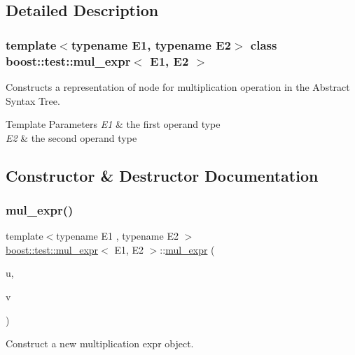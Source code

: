 \subsection{Detailed Description}
\subsubsection*{template$<$typename E1, typename E2$>$\newline
class boost\+::test\+::mul\+\_\+expr$<$ E1, E2 $>$}

Constructs a representation of node for multiplication operation in the Abstract Syntax Tree. 


\begin{DoxyTemplParams}{Template Parameters}
{\em E1} & the first operand type \\
\hline
{\em E2} & the second operand type \\
\hline
\end{DoxyTemplParams}


\subsection{Constructor \& Destructor Documentation}
\mbox{\label{classboost_1_1test_1_1mul__expr_a7ee6cd43e53cc3a611d11021d2ce7b4a}} 
\subsubsection{\texorpdfstring{mul\_expr()}{mul\_expr()}}
{\footnotesize\ttfamily template$<$typename E1 , typename E2 $>$ \\
\mbox{\hyperlink{classboost_1_1test_1_1mul__expr}{boost\+::test\+::mul\+\_\+expr}}$<$ E1, E2 $>$\+::\mbox{\hyperlink{classboost_1_1test_1_1mul__expr}{mul\+\_\+expr}} (\begin{DoxyParamCaption}\item[{E1 const \&}]{u,  }\item[{E2 const \&}]{v }\end{DoxyParamCaption})\hspace{0.3cm}{\ttfamily [inline]}}



Construct a new multiplication expr object. 


